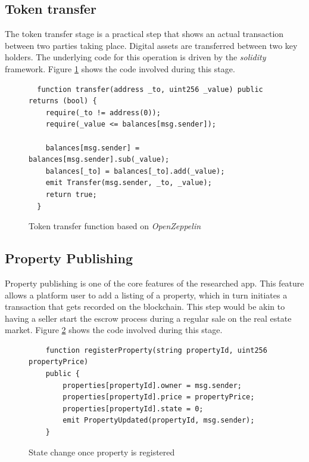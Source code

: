 \documentclass[submission,copyright,creativecommons]{eptcs}
\begin{document}
\subsection{Token transfer}
The token transfer stage is a practical step that shows an actual transaction between two parties taking place.  Digital assets are transferred between two key holders.  The underlying code for this operation is driven by the \textit{solidity} framework. Figure \ref{fig:token_transfer_code} shows the code involved during this stage.

\begin{figure}[h]
\begin{tcolorbox}
\begin{verbatim}
  function transfer(address _to, uint256 _value) public returns (bool) {
    require(_to != address(0));
    require(_value <= balances[msg.sender]);

    balances[msg.sender] = balances[msg.sender].sub(_value);
    balances[_to] = balances[_to].add(_value);
    emit Transfer(msg.sender, _to, _value);
    return true;
  }
\end{verbatim}
\end{tcolorbox}
\caption{Token transfer function based on \textit{OpenZeppelin}\cite{ZeppelinsolidityOpenZeppelinFramework2018}}
\label{fig:token_transfer_code}
\end{figure}

\subsection{Property Publishing}
Property publishing is one of the core features of the researched app. This feature allows a platform user to add a listing of a property, which in turn initiates a transaction that gets recorded on the blockchain.  This step would be akin to having a seller start the escrow process during a regular sale on the real estate market. Figure \ref{fig:property_publishing_code} shows the code involved during this stage.
\begin{figure}[h]
\begin{tcolorbox}
\begin{verbatim}
    function registerProperty(string propertyId, uint256 propertyPrice)
    public {
        properties[propertyId].owner = msg.sender;
        properties[propertyId].price = propertyPrice;
        properties[propertyId].state = 0;
        emit PropertyUpdated(propertyId, msg.sender);
    }
\end{verbatim}
\end{tcolorbox}
\caption{State change once property is registered}
\label{fig:property_publishing_code}
\end{figure}
\end{document}
